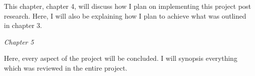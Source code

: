 This chapter, chapter 4, will discuss how I plan on implementing this project post research. Here, I will also be explaining how I plan to achieve what was outlined in chapter 3.

\textit{Chapter 5}

Here, every aspect of the project will be concluded. I will synopsis everything which was reviewed in the entire project.  
